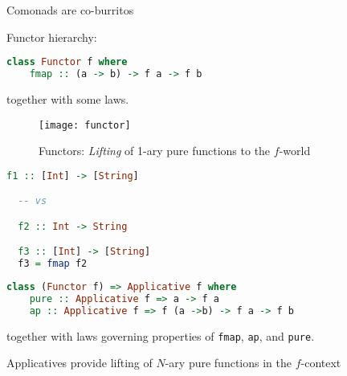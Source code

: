 \documentclass[10pt]{beamer}
\begin{document}
\begin{frame}[fragile]
  \begin{definition}
    Comonads are co-burritos
  \end{definition}
\end{frame}

\begin{frame}[fragile]
  Functor hierarchy:
  \begin{lstlisting}[language=haskell, basicstyle=\ttfamily]
  class Functor f where 
    fmap :: (a -> b) -> f a -> f b 
  \end{lstlisting}

  together with some laws. 
\end{frame}

\begin{frame}[fragile]
  \begin{figure}
    \centering
    \texttt{[image: functor]}
    \caption{Functors: \emph{Lifting} of 1-ary pure functions to the $f$-world}
  \end{figure}
\end{frame}


\begin{frame}[fragile]
  \begin{lstlisting}[language=haskell, basicstyle=\ttfamily]
  f1 :: [Int] -> [String] 

  -- vs 

  f2 :: Int -> String 

  f3 :: [Int] -> [String]
  f3 = fmap f2
  \end{lstlisting}
\end{frame}


\begin{frame}[fragile]
  \begin{lstlisting}[language=haskell, basicstyle=\ttfamily]
  class (Functor f) => Applicative f where 
    pure :: Applicative f => a -> f a 
    ap :: Applicative f => f (a ->b) -> f a -> f b 
  \end{lstlisting}

  together with laws governing properties of \verb|fmap|, \verb|ap|, and \verb|pure|. 

  Applicatives provide lifting of $N$-ary pure functions in the $f$-context

\end{frame}
\end{document}
